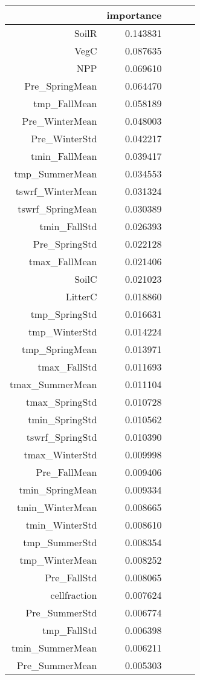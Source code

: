 \begin{tabular}{rrrrr}
\toprule
 & importance \\
\midrule
SoilR & 0.143831 \\
VegC & 0.087635 \\
NPP & 0.069610 \\
Pre_SpringMean & 0.064470 \\
tmp_FallMean & 0.058189 \\
Pre_WinterMean & 0.048003 \\
Pre_WinterStd & 0.042217 \\
tmin_FallMean & 0.039417 \\
tmp_SummerMean & 0.034553 \\
tswrf_WinterMean & 0.031324 \\
tswrf_SpringMean & 0.030389 \\
tmin_FallStd & 0.026393 \\
Pre_SpringStd & 0.022128 \\
tmax_FallMean & 0.021406 \\
SoilC & 0.021023 \\
LitterC & 0.018860 \\
tmp_SpringStd & 0.016631 \\
tmp_WinterStd & 0.014224 \\
tmp_SpringMean & 0.013971 \\
tmax_FallStd & 0.011693 \\
tmax_SummerMean & 0.011104 \\
tmax_SpringStd & 0.010728 \\
tmin_SpringStd & 0.010562 \\
tswrf_SpringStd & 0.010390 \\
tmax_WinterStd & 0.009998 \\
Pre_FallMean & 0.009406 \\
tmin_SpringMean & 0.009334 \\
tmin_WinterMean & 0.008665 \\
tmin_WinterStd & 0.008610 \\
tmp_SummerStd & 0.008354 \\
tmp_WinterMean & 0.008252 \\
Pre_FallStd & 0.008065 \\
cellfraction & 0.007624 \\
Pre_SummerStd & 0.006774 \\
tmp_FallStd & 0.006398 \\
tmin_SummerMean & 0.006211 \\
Pre_SummerMean & 0.005303 \\

\end{tabular}
